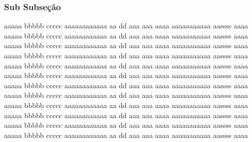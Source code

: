 \subsubsection{Sub Subseção}
aaaaa bbbbb ccccc aaaaaaaaaaaa aa dd  aaa aaa aaaa aaaaaaaaaaa aassss aaaa
aaaaa bbbbb ccccc aaaaaaaaaaaa aa dd  aaa aaa aaaa aaaaaaaaaaa aassss aaaa
aaaaa bbbbb ccccc aaaaaaaaaaaa aa dd  aaa aaa aaaa aaaaaaaaaaa aassss aaaa
aaaaa bbbbb ccccc aaaaaaaaaaaa aa dd  aaa aaa aaaa aaaaaaaaaaa aassss aaaa
aaaaa bbbbb ccccc aaaaaaaaaaaa aa dd  aaa aaa aaaa aaaaaaaaaaa aassss aaaa
aaaaa bbbbb ccccc aaaaaaaaaaaa aa dd  aaa aaa aaaa aaaaaaaaaaa aassss aaaa
aaaaa bbbbb ccccc aaaaaaaaaaaa aa dd  aaa aaa aaaa aaaaaaaaaaa aassss aaaa
aaaaa bbbbb ccccc aaaaaaaaaaaa aa dd  aaa aaa aaaa aaaaaaaaaaa aassss aaaa
aaaaa bbbbb ccccc aaaaaaaaaaaa aa dd  aaa aaa aaaa aaaaaaaaaaa aassss aaaa
aaaaa bbbbb ccccc aaaaaaaaaaaa aa dd  aaa aaa aaaa aaaaaaaaaaa aassss aaaa
aaaaa bbbbb ccccc aaaaaaaaaaaa aa dd  aaa aaa aaaa aaaaaaaaaaa aassss aaaa
aaaaa bbbbb ccccc aaaaaaaaaaaa aa dd  aaa aaa aaaa aaaaaaaaaaa aassss aaaa